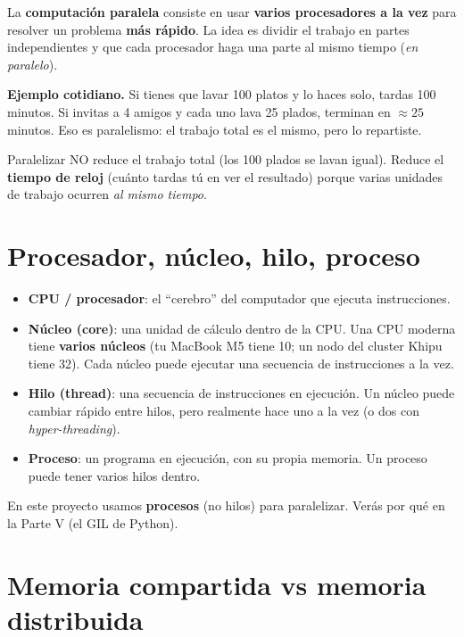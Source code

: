 \documentclass[11pt,a4paper]{article}
\newcommand{\term}[1]{\textbf{\textcolor{clave}{#1}}}
\begin{document}
La \term{computación paralela} consiste en usar \textbf{varios procesadores a la
vez} para resolver un problema \textbf{más rápido}. La idea es dividir el trabajo
en partes independientes y que cada procesador haga una parte al mismo tiempo
(\emph{en paralelo}).

\textbf{Ejemplo cotidiano.} Si tienes que lavar 100 platos y lo haces solo,
tardas 100 minutos. Si invitas a 4 amigos y cada uno lava 25 plados, terminan en
$\approx 25$ minutos. Eso es paralelismo: el trabajo total es el mismo, pero lo
repartiste.

\begin{importante}[title=\textbf{Idea clave}]
Paralelizar NO reduce el trabajo total (los 100 plados se lavan igual). Reduce
el \textbf{tiempo de reloj} (cuánto tardas tú en ver el resultado) porque varias
unidades de trabajo ocurren \emph{al mismo tiempo}.
\end{importante}

\section{Procesador, núcleo, hilo, proceso}

\begin{itemize}
  \item \term{CPU / procesador}: el ``cerebro'' del computador que ejecuta
        instrucciones.
  \item \term{Núcleo (core)}: una unidad de cálculo dentro de la CPU. Una CPU
        moderna tiene \textbf{varios núcleos} (tu MacBook M5 tiene 10; un nodo del
        cluster Khipu tiene 32). Cada
        núcleo puede ejecutar una secuencia de instrucciones a la vez.
  \item \term{Hilo (thread)}: una secuencia de instrucciones en ejecución. Un
        núcleo puede cambiar rápido entre hilos, pero realmente hace uno a la vez
        (o dos con \emph{hyper-threading}).
  \item \term{Proceso}: un programa en ejecución, con su propia memoria. Un
        proceso puede tener varios hilos dentro.
\end{itemize}

En este proyecto usamos \textbf{procesos} (no hilos) para paralelizar. Verás por
qué en la Parte V (el GIL de Python).

\section{Memoria compartida vs memoria distribuida}
\end{document}
